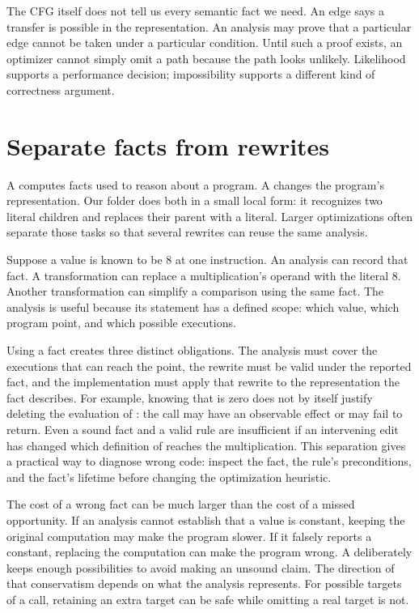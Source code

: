The CFG itself does not tell us every semantic fact we need.
An edge says a transfer is possible in the representation.
An analysis may prove that a particular edge cannot be taken under a particular condition.
Until such a proof exists, an optimizer cannot simply omit a path because the path looks unlikely.
Likelihood supports a performance decision; impossibility supports a different kind of correctness argument.

\section{Separate facts from rewrites}
\label{sec:analysis-and-transformation}

A  computes facts used to reason about a program.
A  changes the program's representation.
Our folder does both in a small local form: it recognizes two literal children and replaces their parent with a literal.
Larger optimizations often separate those tasks so that several rewrites can reuse the same analysis.

Suppose a value is known to be $8$ at one instruction.
An analysis can record that fact.
A transformation can replace a multiplication's operand with the literal $8$.
Another transformation can simplify a comparison using the same fact.
The analysis is useful because its statement has a defined scope: which value, which program point, and which possible executions.

Using a fact creates three distinct obligations.
The analysis must cover the executions that can reach the point, the rewrite must be valid under the reported fact, and the implementation must apply that rewrite to the representation the fact describes.
For example, knowing that  is zero does not by itself justify deleting the evaluation of : the call may have an observable effect or may fail to return.
Even a sound fact and a valid rule are insufficient if an intervening edit has changed which definition of  reaches the multiplication.
This separation gives a practical way to diagnose wrong code: inspect the fact, the rule's preconditions, and the fact's lifetime before changing the optimization heuristic.

The cost of a wrong fact can be much larger than the cost of a missed opportunity.
If an analysis cannot establish that a value is constant, keeping the original computation may make the program slower.
If it falsely reports a constant, replacing the computation can make the program wrong.
A  deliberately keeps enough possibilities to avoid making an unsound claim.
The direction of that conservatism depends on what the analysis represents.
For possible targets of a call, retaining an extra target can be safe while omitting a real target is not.

